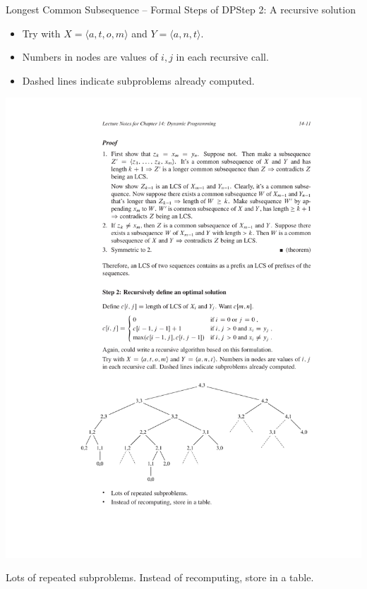 \documentclass[aspectratio=169]{beamer}
\newcommand{\toRight}[1]{
    \begin{FlushRight}
        {\small #1}
    \end{FlushRight}
}
\begin{document}
\begin{frame}{Longest Common Subsequence -- Formal Steps of DP}{Step 2: A recursive solution}
    \begin{itemize}
        \item Try with $X=\langle a,t,o,m \rangle$ and $Y=\langle a,n,t \rangle$.
        \item Numbers in nodes are values of $i, j$ in each recursive call.
        \item Dashed lines indicate subproblems already computed.
    \end{itemize}
    \centering
    \includegraphics[width=\textwidth,clip,trim=4cm 4.25cm 3cm 17cm]{figures/overlapping.pdf}
    \vspace{-10mm}
    \toRight{\tiny Lots of repeated subproblems. Instead of recomputing, store in a table.}
\end{frame}
\end{document}
